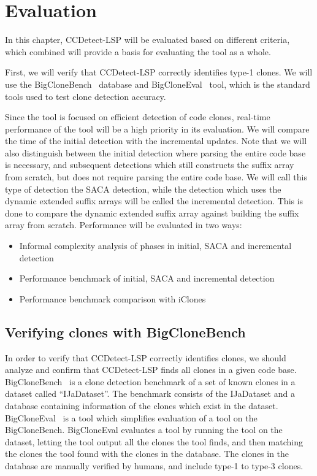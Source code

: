 \chapter{Evaluation}
\label{evaluation}

In this chapter, CCDetect-LSP will be evaluated based on different criteria, which combined
will provide a basis for evaluating the tool as a whole.

First, we will verify that CCDetect-LSP correctly identifies type-1 clones. We will use
the BigCloneBench~\cite{BigCloneBench} database and BigCloneEval~\cite{BigCloneEval} tool,
which is the standard tools used to test clone detection accuracy.

Since the tool is focused on efficient detection of code clones, real-time performance of
the tool will be a high priority in its evaluation. We will compare the time of the
initial detection with the incremental updates. Note that we will also distinguish between
the initial detection where parsing the entire code base is necessary, and subsequent
detections which still constructs the suffix array from scratch, but does not require
parsing the entire code base. We will call this type of detection the SACA detection,
while the detection which uses the dynamic extended suffix arrays will be called the
incremental detection. This is done to compare the dynamic extended suffix array against
building the suffix array from scratch. Performance will be evaluated in two ways:

\begin{itemize}
    \item Informal complexity analysis of phases in initial, SACA and incremental detection
    \item Performance benchmark of initial, SACA and incremental detection
    \item Performance benchmark comparison with iClones~\cite{GodeIncrementalCloneDetection}
\end{itemize}

\section{Verifying clones with BigCloneBench}

In order to verify that CCDetect-LSP correctly identifies clones, we should analyze and
confirm that CCDetect-LSP finds all clones in a given code base.
BigCloneBench~\cite{BigCloneBench} is a clone detection benchmark of a set of known clones
in a dataset called ``IJaDataset''. The benchmark consists of the IJaDataset and a
database containing information of the clones which exist in the dataset.
BigCloneEval~\cite{BigCloneEval} is a tool which simplifies evaluation of a tool on the
BigCloneBench. BigCloneEval evaluates a tool by running the tool on the dataset, letting
the tool output all the clones the tool finds, and then matching the clones the tool found
with the clones in the database. The clones in the database are manually verified by
humans, and include type-1 to type-3 clones.


